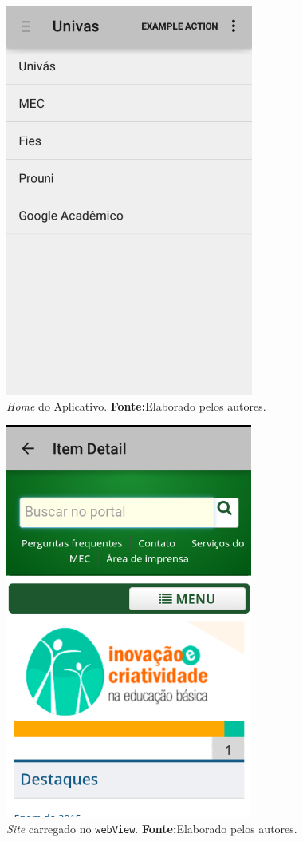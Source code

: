 \begin{figure}[h!]
	\centerline{\includegraphics[scale=0.4]{./imagens/3_discussao_resultados/dr2.png}}
	\caption[\textit{Home} do Aplicativo]{\textit{Home} do Aplicativo.
		\textbf{Fonte:}Elaborado pelos autores.}
	\label{fig:dr2}
\end{figure}	

\begin{figure}[h!]
	\centerline{\includegraphics[scale=0.4]{./imagens/3_discussao_resultados/dr3.png}}
	\caption[\textit{Site} carregado no \texttt{webView}]{\textit{Site} carregado no \texttt{webView}.
		\textbf{Fonte:}Elaborado pelos autores.}
	\label{fig:dr3}
\end{figure}
\pagebreak	

